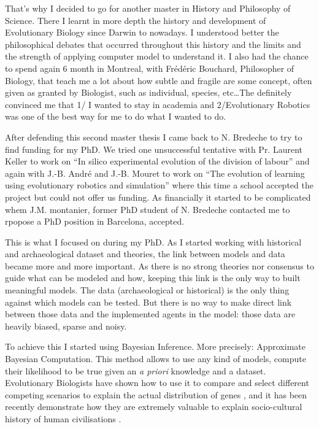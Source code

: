 \documentclass[10pt]{article}
\begin{document}
That's why I decided to go for another master in History and Philosophy of Science. There I learnt in more depth the history and development of Evolutionary Biology since Darwin to nowadays. I understood better the philosophical debates that occurred throughout this history and the limits and the strength of applying computer model to understand it. I also had the chance to spend again 6 month in Montreal, with Frédéric Bouchard, Philosopher of Biology, that teach me a lot about how subtle and fragile are some concept, often given as granted by Biologist, such as individual, species, etc\ldots The definitely convinced me that 1/ I wanted to stay in academia and 2/Evolutionary Robotics was one of the best way for me to do what I wanted to do.

After defending this second master thesis I came back to  N. Bredeche to try to find funding for my PhD. We tried one unsuccessful tentative with Pr. Laurent Keller to work on ``In silico experimental evolution of the division of labour'' and again with J.-B. André and J.-B. Mouret to work on ``The evolution of learning using evolutionary robotics and simulation'' where this time a school accepted the project but could not offer us funding. As financially it started to be complicated whem J.M. montanier, former PhD student of N. Bredeche contacted me to rpopose a PhD position in Barcelona, accepted.


This is what I focused on during my PhD. As I started working with historical and archaeological dataset and theories, the link between models and data became more and more important. As there is no strong theories nor consensus to guide what can be modeled and how, keeping this link is the only way to built meaningful models. The data (archaeological or historical) is the only thing against which models can be tested. But there is no way to make direct link between those data and the implemented agents in the model: those data are heavily biased, sparse and noisy. 

To achieve this I started using Bayesian Inference. More precisely: Approximate Bayesian Computation. This method allows to use any kind of models, compute their likelihood to be true given an \emph{a priori} knowledge and a dataset. Evolutionary Biologists have shown how to use it to compare and select different competing scenarios to explain the actual distribution of genes \cite{beaumont2009adaptiveapproximatebayesiancomputation}, and it has been recently demonstrate how they are extremely valuable to explain socio-cultural history of human civilisations \cite{rubiocampillo2016modelselectioninhistoricalresearchusingapproximatebayesiancomputation,kandler2017inferringindividuallevelprocessesfrompopulationlevelpatternsinculturalevolution}.
\end{document}
